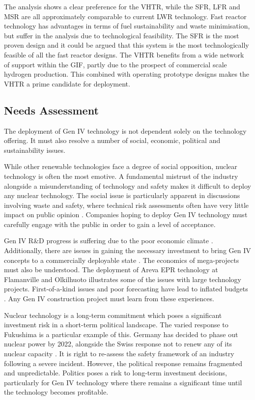 \documentclass[journal]{IEEEtran}
\begin{document}
The analysis shows a clear preference for the VHTR, while the SFR, LFR and MSR are all approximately comparable to current LWR technology.
Fast reactor technology has advantages in terms of fuel sustainability and waste minimisation, but suffer in the analysis due to technological feasibility.
The SFR is the most proven design and it could be argued that this system is the most technologically feasible of all the fast reactor designs.
The VHTR benefits from a wide network of support within the GIF, partly due to the prospect of commercial scale hydrogen production.
This combined with operating prototype designs makes the VHTR a prime candidate for deployment.

\subsection{Needs Assessment}
The deployment of Gen IV technology is not dependent solely on the technology offering.
It must also resolve a number of social, economic, political and sustainability issues.

While other renewable technologies face a degree of social opposition, nuclear technology is often the most emotive.
A fundamental mistrust of the industry alongside a misunderstanding of technology and safety makes it difficult to deploy any nuclear technology.
The social issue is particularly apparent in discussions involving waste and safety, where technical risk assessments often have very little impact on public opinion \cite{Marques2010a}.
Companies hoping to deploy Gen IV technology must carefully engage with the public in order to gain a level of acceptance.

Gen IV R\&D progress is suffering due to the poor economic climate \cite{nnl}.
Additionally, there are issues in gaining the necessary investment to bring Gen IV concepts to a commercially deployable state \cite{Bhatnagar2011}.
The economics of mega-projects must also be understood.
The deployment of Areva EPR technology at Flamanville and Olkilhuoto illustrates some of the issues with large technology projects.
First-of-a-kind issues and poor forecasting have lead to inflated budgets \cite{Locatelli2013}.
Any Gen IV construction project must learn from these experiences.

Nuclear technology is a long-term commitment which poses a significant investment risk in a short-term political landscape.
The varied response to Fukushima is a particular example of this.
Germany has decided to phase out nuclear power by 2022, alongside the Swiss response not to renew any of its nuclear capacity \cite{schneider2012nuclear}.
It is right to re-assess the safety framework of an industry following a severe incident.
However, the political response remains fragmented and unpredictable.
Politics poses a risk to long-term investment decisions, particularly for Gen IV technology where there remains a significant time until the technology becomes profitable.
\end{document}
